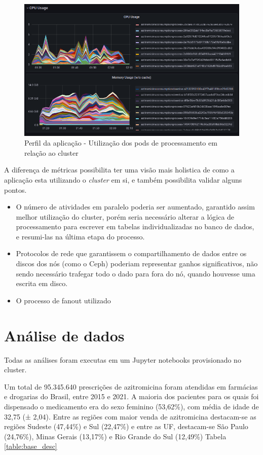 \begin{figure}[!ht]
    \centering
    \includegraphics[width=0.85\linewidth]{04-figuras/etl_2_usage.png}
    \caption{Perfil da aplicação - Utilização dos pods de processamento em relação ao cluster}
    \label{fig:cluster}
\end{figure}

A diferença de métricas possibilita ter uma visão mais holistica de como a aplicação esta utilizando o \emph{cluster} em si, e também possibilita validar alguns pontos. 
\begin{itemize}
    \item O número de atividades em paralelo poderia ser aumentado, garantido assim melhor utilização do cluster, porém seria necessário alterar a lógica de processamento para escrever em tabelas individualizadas no banco de dados, e resumi-las na última etapa do processo. 
    \item Protocolos de rede que garantissem o compartilhamento de dados entre os discos dos nós (como o Ceph) poderiam representar ganhos significativos, não sendo necessário trafegar todo o dado para fora do nó, quando houvesse uma escrita em disco.
    \item O processo de fanout utilizado 
\end{itemize}

\section{Análise de dados}
Todas as análises foram executas em um Jupyter notebooks provisionado no cluster.

Um total de 95.345.640 prescrições de azitromicina foram atendidas em farmácias e drogarias do Brasil, entre 2015 e 2021. A maioria dos pacientes para os quais foi dispensado o medicamento era do sexo feminino (53,62\%), com média de idade de 32,75 (± 2,04). Entre as regiões com maior venda de azitromicina destacam-se as regiões Sudeste (47,44\%) e Sul (22,47\%) e entre as UF, destacam-se São Paulo (24,76\%), Minas Gerais (13,17\%) e Rio Grande do Sul (12,49\%) Tabela \ref{table:base_desc}

